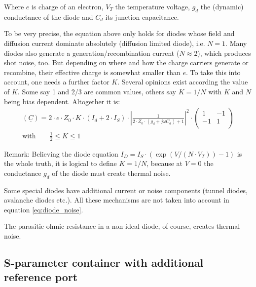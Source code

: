 \documentclass[10pt]{report}
\begin{document}
Where $e$ is charge of an electron, $V_T$ the temperature voltage,
$g_d$ the (dynamic) conductance of the diode and $C_d$ its junction
capacitance.

\addvspace{12pt}

To be very precise, the equation above only holds for diodes whose
field and diffusion current dominate absolutely (diffusion limited
diode), i.e. $N=1$.  Many diodes also generate a
generation/recombination current ($N\approx 2$), which produces shot
noise, too.  But depending on where and how the charge carriers
generate or recombine, their effective charge is somewhat smaller than
$e$.  To take this into account, one needs a further factor $K$.
Several opinions exist according the value of $K$.  Some say 1 and 2/3
are common values, others say $K=1/N$ with $K$ and $N$ being bias
dependent.  Altogether it is:
\begin{equation}
\begin{split}
(\underline{C})
 = 2\cdot e\cdot Z_0\cdot K\cdot \left(I_{d} + 2\cdot I_{S}\right)\cdot
    \left| \frac{1}{2\cdot Z_0\cdot (g_d+j\omega C_d) + 1}\right|^2 \cdot
\begin{pmatrix}
   1 & -1\\
  -1 &  1\\
\end{pmatrix}\\
\text{with}\qquad\frac{1}{2}\le K \le 1
\end{split}
\label{eq:diode_noise}
\end{equation}

Remark: Believing the diode equation $I_D = I_S\cdot (\exp(V/(N\cdot
V_T)) - 1)$ is the whole truth, it is logical to define $K=1/N$,
because at $V=0$ the conductance $g_d$ of the diode must create
thermal noise.

\addvspace{12pt}

Some special diodes have additional current or noise components
(tunnel diodes, avalanche diodes etc.).  All these mechanisms are not
taken into account in equation \eqref{eq:diode_noise}.

\addvspace{12pt}

The parasitic ohmic resistance in a non-ideal diode, of course,
creates thermal noise.

\subsection{S-parameter container with additional reference port}
\end{document}
